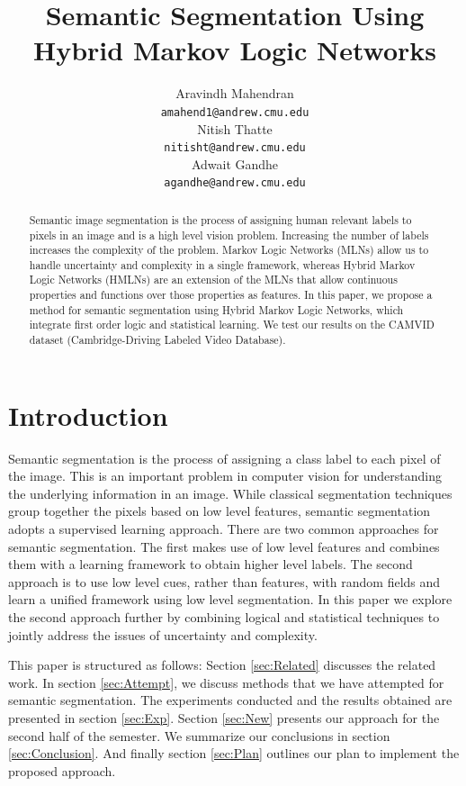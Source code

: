 \documentclass{article} %
\title{Semantic Segmentation Using Hybrid Markov Logic Networks}
\author{
Aravindh Mahendran \\
\texttt{amahend1@andrew.cmu.edu} \\ 
\And
Nitish Thatte \\
\texttt{nitisht@andrew.cmu.edu} \\
\AND
Adwait Gandhe \\
\texttt{agandhe@andrew.cmu.edu} \\
}
\begin{document}
\maketitle

\begin{abstract}
Semantic image segmentation is the process of assigning human relevant labels to pixels in an image and is a high level vision problem. Increasing the number of labels increases the complexity of the problem. Markov Logic Networks (MLNs) allow us to handle uncertainty and complexity in a single framework, whereas Hybrid Markov Logic Networks (HMLNs) are an extension of the MLNs that allow continuous properties and functions over those properties as features.  In this paper, we propose a method for semantic segmentation using Hybrid Markov Logic Networks, which integrate first order logic and statistical learning. We test our results on the CAMVID dataset (Cambridge-Driving Labeled Video Database).  
\end{abstract}


\section{Introduction}
\label{sec:Intro}
Semantic segmentation is the process of assigning a class label to each pixel of the image. This is an important problem in computer vision for understanding the underlying information in an image. While classical segmentation techniques group together the pixels based on low level features, semantic segmentation adopts a supervised learning approach. There are two common approaches for semantic segmentation. The first makes use of low level features and combines them with a learning framework to obtain higher level labels. The second approach is to use low level cues, rather than features, with random fields and learn a unified framework using low level segmentation. In this paper we explore the second approach further by combining logical and statistical techniques to jointly address the issues of uncertainty and complexity. 

This paper is structured as follows: Section \ref{sec:Related} discusses the related work. In section \ref{sec:Attempt}, we discuss methods that we have attempted for semantic segmentation. The experiments conducted and the results obtained are presented in section \ref{sec:Exp}. Section \ref{sec:New} presents our approach for the second half of the semester. We summarize our conclusions in section \ref{sec:Conclusion}. And finally section \ref{sec:Plan} outlines our plan to implement the proposed approach.
\end{document}
